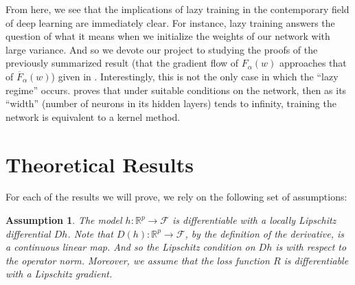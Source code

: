 \documentclass{article}
\newtheorem*{assumption}{Assumption}
\begin{document}
From here, we see that the implications of lazy training in the contemporary field of deep learning are immediately clear. For instance, lazy training answers the question of what it means when we initialize the weights of our network with large variance. And so we devote our project to studying the proofs of the previously summarized result (that the gradient flow of $F_{\alpha}(w)$ approaches that of $\overline{F}_{\alpha}(w)$) given in \cite{chizat2018lazy}. Interestingly, this is not the only case in which the \enquote{lazy regime} occurs. \cite{jacot2018neural} proves that under suitable conditions on the network, then as its \enquote{width} (number of neurons in its hidden layers) tends to infinity, training the network is equivalent to a kernel method.

\pagebreak 
\section{Theoretical Results}
For each of the results we will prove, we rely on the following set of assumptions:
\begin{assumption}
The model $h: \mathbb{R}^p \rightarrow \mathcal{F}$ is differentiable with a locally Lipschitz differential $Dh$. Note that $D(h): \mathbb{R}^p \rightarrow \mathcal{F}$, by the definition of the derivative, is a continuous linear map. And so the Lipschitz condition on $Dh$ is with respect to the operator norm. Moreover, we assume that the loss function $R$ is differentiable with a Lipschitz gradient.
\end{assumption}
\end{document}
